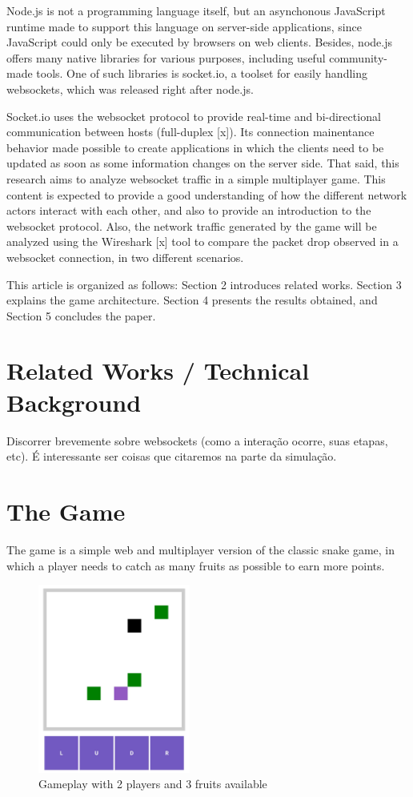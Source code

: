 \documentclass[english]{sbrt}
\begin{document}
Node.js is not a programming language itself, but an asynchonous JavaScript runtime made to support this language on server-side applications, since JavaScript could
only be executed by browsers on web clients. Besides, node.js offers many native libraries for various purposes, including useful community-made tools. One of such libraries is socket.io, a toolset for easily handling websockets, which was released right after node.js.

Socket.io uses the websocket protocol to provide real-time and bi-directional communication between hosts (full-duplex [x]). Its connection mainentance behavior made possible to create applications in which the clients need to be updated as soon as some information changes on the server side. That said, this research aims to analyze websocket traffic in a simple multiplayer game. This content is expected to provide a good understanding of how the different network
actors interact with each other, and also to provide an introduction to the websocket protocol. Also, the network traffic generated by the game will be analyzed
using the Wireshark [x] tool to compare the packet drop observed in a websocket connection, in two different scenarios.

This article is organized as follows: Section 2 introduces related works. Section 3 explains the game architecture. Section 4 presents the results obtained, and Section 5 concludes the paper.

\section{\textbf{Related Works / Technical Background}}
Discorrer brevemente sobre websockets (como a interação ocorre, suas etapas, etc). É interessante ser coisas que citaremos na parte da simulação.

\section{\textbf{The Game}}
The game is a simple web and multiplayer version of the classic snake game, in which a player needs to
catch as many fruits as possible to earn more points.

\begin{figure}[H]
  \centering
  \includegraphics[width=5cm]{game-screen.jpg}
  \caption{Gameplay with 2 players and 3 fruits available}
  \label{game-screen}
\end{figure}
\end{document}
